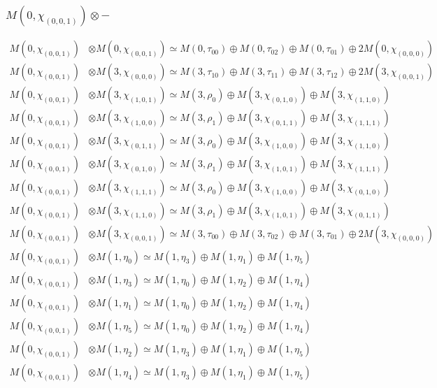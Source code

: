 \subsubsection{$ M(0,\chi_{(0,0,1)})\otimes -$}
\begin{align*}
M(0,\chi_{(0,0,1)}) &\otimes M(0,\chi_{(0,0,1)}) \simeq M(0,\tau_{00}) \oplus M(0,\tau_{02}) \oplus M(0,\tau_{01}) \oplus 2 M(0,\chi_{(0,0,0)})\\
M(0,\chi_{(0,0,1)}) &\otimes M(3,\chi_{(0,0,0)}) \simeq M(3,\tau_{10}) \oplus M(3,\tau_{11}) \oplus M(3,\tau_{12}) \oplus 2 M(3,\chi_{(0,0,1)})\\
M(0,\chi_{(0,0,1)}) &\otimes M(3,\chi_{(1,0,1)}) \simeq M(3,\rho_{0}) \oplus M(3,\chi_{(0,1,0)}) \oplus M(3,\chi_{(1,1,0)})\\
M(0,\chi_{(0,0,1)}) &\otimes M(3,\chi_{(1,0,0)}) \simeq M(3,\rho_{1}) \oplus M(3,\chi_{(0,1,1)}) \oplus M(3,\chi_{(1,1,1)})\\
M(0,\chi_{(0,0,1)}) &\otimes M(3,\chi_{(0,1,1)}) \simeq M(3,\rho_{0}) \oplus M(3,\chi_{(1,0,0)}) \oplus M(3,\chi_{(1,1,0)})\\
M(0,\chi_{(0,0,1)}) &\otimes M(3,\chi_{(0,1,0)}) \simeq M(3,\rho_{1}) \oplus M(3,\chi_{(1,0,1)}) \oplus M(3,\chi_{(1,1,1)})\\
M(0,\chi_{(0,0,1)}) &\otimes M(3,\chi_{(1,1,1)}) \simeq M(3,\rho_{0}) \oplus M(3,\chi_{(1,0,0)}) \oplus M(3,\chi_{(0,1,0)})\\
M(0,\chi_{(0,0,1)}) &\otimes M(3,\chi_{(1,1,0)}) \simeq M(3,\rho_{1}) \oplus M(3,\chi_{(1,0,1)}) \oplus M(3,\chi_{(0,1,1)})\\
M(0,\chi_{(0,0,1)}) &\otimes M(3,\chi_{(0,0,1)}) \simeq M(3,\tau_{00}) \oplus M(3,\tau_{02}) \oplus M(3,\tau_{01}) \oplus 2 M(3,\chi_{(0,0,0)})\\
M(0,\chi_{(0,0,1)}) &\otimes M(1,\eta_{0}) \simeq M(1,\eta_{3}) \oplus M(1,\eta_{1}) \oplus M(1,\eta_{5})\\
M(0,\chi_{(0,0,1)}) &\otimes M(1,\eta_{3}) \simeq M(1,\eta_{0}) \oplus M(1,\eta_{2}) \oplus M(1,\eta_{4})\\
M(0,\chi_{(0,0,1)}) &\otimes M(1,\eta_{1}) \simeq M(1,\eta_{0}) \oplus M(1,\eta_{2}) \oplus M(1,\eta_{4})\\
M(0,\chi_{(0,0,1)}) &\otimes M(1,\eta_{5}) \simeq M(1,\eta_{0}) \oplus M(1,\eta_{2}) \oplus M(1,\eta_{4})\\
M(0,\chi_{(0,0,1)}) &\otimes M(1,\eta_{2}) \simeq M(1,\eta_{3}) \oplus M(1,\eta_{1}) \oplus M(1,\eta_{5})\\
M(0,\chi_{(0,0,1)}) &\otimes M(1,\eta_{4}) \simeq M(1,\eta_{3}) \oplus M(1,\eta_{1}) \oplus M(1,\eta_{5})\\

\end{align*}
